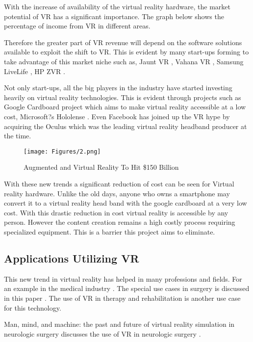 With the increase of availability of the virtual reality hardware, the market potential of VR has a significant importance. The graph below shows the percentage of income from VR in different areas.

Therefore the greater part of VR revenue will depend on the software solutions available to exploit the shift to VR. This is evident by many start-ups forming to take advantage of this market niche such as, Jaunt VR \cite{4}, Vahana VR \cite{5}, Samsung LiveLife \cite{6}, HP ZVR \cite{7}.

Not only start-ups, all the big players in the industry have started investing heavily on virtual reality technologies. This is evident through projects such as Google Cardboard project \cite{2} which aims to make virtual reality accessible at a low cost, Microsoft?s Hololense \cite{8}. Even Facebook has joined up the VR hype by acquiring the Oculus which was the leading virtual reality headband producer at the time.

\begin{figure}[htbp]
\begin{center}
\texttt{[image: Figures/2.png]}
\caption{Augmented and Virtual Reality To Hit \$150 Billion \cite{3}}
\label{fig1_2}
\end{center}
\end{figure}

With these new trends a significant reduction of cost can be seen for Virtual reality hardware. Unlike the old days, anyone who owns a smartphone may convert it to a virtual reality head band with the google cardboard at a very low cost. With this drastic reduction in cost virtual reality is accessible by any person. However the content creation remains a high costly process requiring specialized equipment. This is a barrier this project aims to eliminate.

\subsection{Applications Utilizing VR}
\label{intro_subsec:2_2}

This new trend in virtual reality has helped in many professions and fields. For an example in the medical industry \cite{9}. The special use cases in surgery is discussed in this paper \cite{10}. The use of VR in therapy and rehabilitation is another use case for this technology. 

Man, mind, and machine: the past and future of virtual reality simulation in neurologic surgery discusses the use of VR in neurologic surgery \cite{11}.

